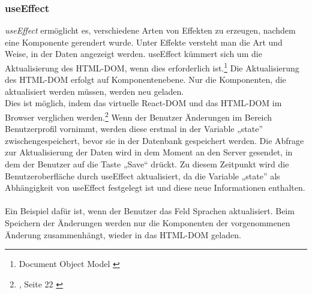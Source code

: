 \subsubsection*{useEffect}
\textit{useEffect} ermöglicht es, verschiedene Arten von Effekten zu erzeugen, nachdem eine Komponente gerendert wurde. Unter Effekte versteht man die Art und Weise, in der Daten angezeigt werden. useEffect kümmert sich um die Aktualisierung des HTML-DOM, wenn dies erforderlich ist.\footnote{Document Object Model {\cite{MO2}}} Die Aktualisierung des HTML-DOM erfolgt auf Komponentenebene. Nur die Komponenten, die aktualisiert werden müssen, werden neu geladen.\\
Dies ist möglich, indem  das virtuelle React-DOM und das HTML-DOM im Browser verglichen werden\cite{R06}.\footnote{{, Seite 22 \cite{AN1}}} Wenn der Benutzer Änderungen im Bereich Benutzerprofil vornimmt, werden diese erstmal in der Variable „state” zwischengespeichert, bevor sie in der Datenbank gespeichert werden. Die Abfrage zur Aktualisierung der Daten wird in dem Moment an den Server gesendet, in dem der Benutzer auf die Taste „Save“ drückt. Zu diesem Zeitpunkt wird die Benutzeroberfläche durch useEffect aktualisiert, da die Variable „state” als Abhängigkeit von useEffect festgelegt ist und diese neue Informationen enthalten.
\\\\
Ein Beispiel dafür ist, wenn der Benutzer das Feld Sprachen aktualisiert. Beim Speichern der Änderungen werden nur die Komponenten der vorgenommenen Änderung zusammenhängt, wieder in das HTML-DOM geladen.

